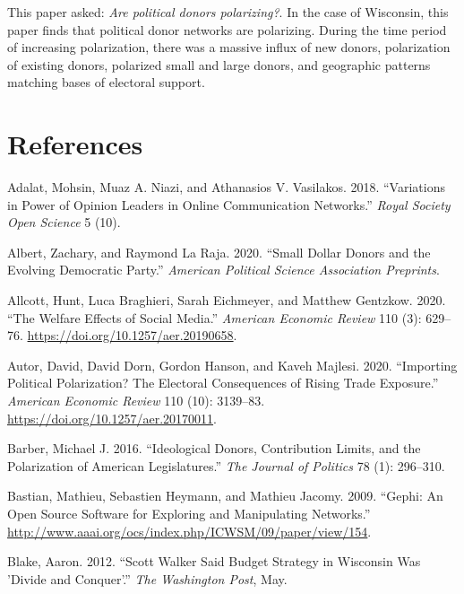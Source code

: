 \documentclass[12pt,]{article}
\begin{document}
This paper asked: \emph{Are political donors polarizing?}. In the case
of Wisconsin, this paper finds that political donor networks are
polarizing. During the time period of increasing polarization, there was
a massive influx of new donors, polarization of existing donors,
polarized small and large donors, and geographic patterns matching bases
of electoral support.

\newpage

\hypertarget{references}{%
\section*{References}\label{references}}

\hypertarget{refs}{}
\leavevmode\hypertarget{ref-adalat2018}{}%
Adalat, Mohsin, Muaz A. Niazi, and Athanasios V. Vasilakos. 2018.
``Variations in Power of Opinion Leaders in Online Communication
Networks.'' \emph{Royal Society Open Science} 5 (10).

\leavevmode\hypertarget{ref-albert2020}{}%
Albert, Zachary, and Raymond La Raja. 2020. ``Small Dollar Donors and
the Evolving Democratic Party.'' \emph{American Political Science
Association Preprints}.

\leavevmode\hypertarget{ref-allcott2020}{}%
Allcott, Hunt, Luca Braghieri, Sarah Eichmeyer, and Matthew Gentzkow.
2020. ``The Welfare Effects of Social Media.'' \emph{American Economic
Review} 110 (3): 629--76. \url{https://doi.org/10.1257/aer.20190658}.

\leavevmode\hypertarget{ref-autor2020}{}%
Autor, David, David Dorn, Gordon Hanson, and Kaveh Majlesi. 2020.
``Importing Political Polarization? The Electoral Consequences of Rising
Trade Exposure.'' \emph{American Economic Review} 110 (10): 3139--83.
\url{https://doi.org/10.1257/aer.20170011}.

\leavevmode\hypertarget{ref-barber2016a}{}%
Barber, Michael J. 2016. ``Ideological Donors, Contribution Limits, and
the Polarization of American Legislatures.'' \emph{The Journal of
Politics} 78 (1): 296--310.

\leavevmode\hypertarget{ref-gephi}{}%
Bastian, Mathieu, Sebastien Heymann, and Mathieu Jacomy. 2009. ``Gephi:
An Open Source Software for Exploring and Manipulating Networks.''
\url{http://www.aaai.org/ocs/index.php/ICWSM/09/paper/view/154}.

\leavevmode\hypertarget{ref-blake2012}{}%
Blake, Aaron. 2012. ``Scott Walker Said Budget Strategy in Wisconsin Was
'Divide and Conquer'.'' \emph{The Washington Post}, May.
\end{document}
